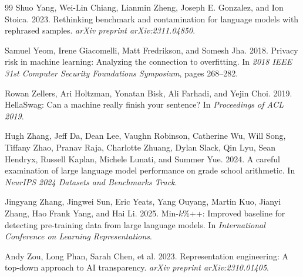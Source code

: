 \documentclass[10pt,twocolumn,letterpaper]{article}
\begin{document}
\begin{thebibliography}{99}
Shuo Yang, Wei-Lin Chiang, Lianmin Zheng, Joseph E. Gonzalez, and Ion Stoica. 2023.
Rethinking benchmark and contamination for language models with rephrased samples.
\emph{arXiv preprint arXiv:2311.04850}.

Samuel Yeom, Irene Giacomelli, Matt Fredrikson, and Somesh Jha. 2018.
Privacy risk in machine learning: Analyzing the connection to overfitting.
In \emph{2018 IEEE 31st Computer Security Foundations Symposium}, pages 268--282.

Rowan Zellers, Ari Holtzman, Yonatan Bisk, Ali Farhadi, and Yejin Choi. 2019.
HellaSwag: Can a machine really finish your sentence?
In \emph{Proceedings of ACL 2019}.

Hugh Zhang, Jeff Da, Dean Lee, Vaughn Robinson, Catherine Wu, Will Song, Tiffany Zhao, Pranav Raja, Charlotte Zhuang, Dylan Slack, Qin Lyu, Sean Hendryx, Russell Kaplan, Michele Lunati, and Summer Yue. 2024.
A careful examination of large language model performance on grade school arithmetic.
In \emph{NeurIPS 2024 Datasets and Benchmarks Track}.

Jingyang Zhang, Jingwei Sun, Eric Yeats, Yang Ouyang, Martin Kuo, Jianyi Zhang, Hao Frank Yang, and Hai Li. 2025.
Min-$k$\%++: Improved baseline for detecting pre-training data from large language models.
In \emph{International Conference on Learning Representations}.

Andy Zou, Long Phan, Sarah Chen, et al. 2023.
Representation engineering: A top-down approach to AI transparency.
\emph{arXiv preprint arXiv:2310.01405}.

\end{thebibliography}
\end{document}
